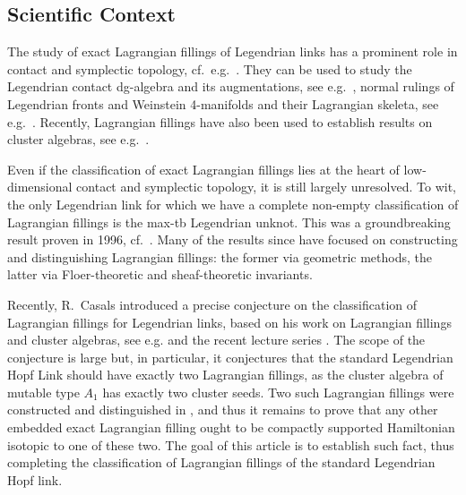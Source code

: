 \documentclass[10pt]{amsart}
\theoremstyle{plain}
\theoremstyle{definition}
\numberwithin{equation}{section}
\begin{document}
\subsection{Scientific Context}\label{sec:scientificContext}
The study of exact Lagrangian fillings of Legendrian links has a prominent role in contact and symplectic topology, cf.~e.g.~\cite{MR3402346,MR4358415,Casals24_ClusterSeed,Casals22_braidloopsinfinitemonodromy,Chekanov97_LDGA,Ekholm12_LagrangianCobord,EGH00_SFT,MR4194293}. They can be used to study the Legendrian contact dg-algebra and its augmentations, see e.g.~\cite{Chekanov97_LDGA,MR4575870}, normal rulings of Legendrian fronts \cite{MR3335247,MR3784016} and Weinstein 4-manifolds and their Lagrangian skeleta, see e.g.~\cite{Casals19_LegFronts,Casals20_LagrangianSkeleta}. Recently, Lagrangian fillings have also been used to establish results on cluster algebras, see e.g.~\cite{casals2023demazureweavesreducedplabic,Casals24_Microlocal,Casals24_ClusterBraidVarieties}.

Even if the classification of exact Lagrangian fillings lies at the heart of low-dimensional contact and symplectic topology, it is still largely unresolved. To wit, the only Legendrian link for which we have a complete non-empty classification of Lagrangian fillings is the max-tb Legendrian unknot. This was a groundbreaking result proven in 1996, cf.~\cite[Theorem 1.1.A]{Eliashberg96_LocalLagr2Knots}. Many of the results since have focused on constructing and distinguishing Lagrangian fillings: the former via geometric methods, the latter via Floer-theoretic and sheaf-theoretic invariants.

Recently, R.~Casals introduced a precise conjecture on the classification of Lagrangian fillings for Legendrian links, based on his work on Lagrangian fillings and cluster algebras, see e.g.\cite{MR4358415,Casals24_ClusterSeed,Casals24_ClusterBraidVarieties} and the recent lecture series \cite{casals_cbms}. The scope of the conjecture is large but, in particular, it conjectures that the standard Legendrian Hopf Link should have exactly two Lagrangian fillings, as the cluster algebra of mutable type $A_1$ has exactly two cluster seeds. Two such Lagrangian fillings were constructed and distinguished in \cite{Ekholm12_LagrangianCobord,Pan17_ExactLagrFillings}, and thus it remains to prove that any other embedded exact Lagrangian filling ought to be compactly supported Hamiltonian isotopic to one of these two. The goal of this article is to establish such fact, thus completing the classification of Lagrangian fillings of the standard Legendrian Hopf link.
\end{document}
